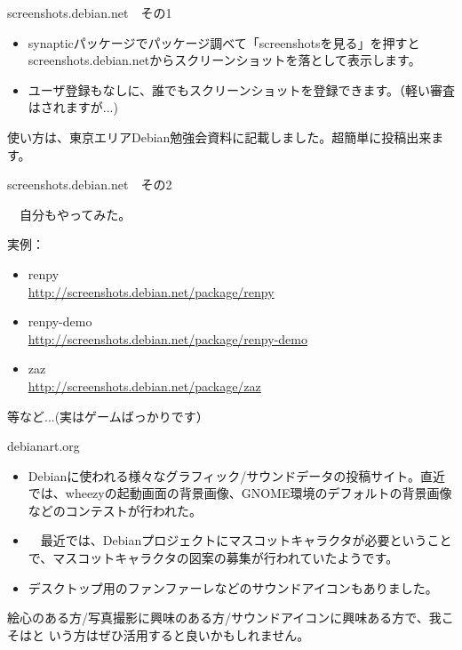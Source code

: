 \begin{frame}{screenshots.debian.net　その1}

\begin{itemize}
\item synapticパッケージでパッケージ調べて「screenshotsを見る」を押すと
screenshots.debian.netからスクリーンショットを落として表示します。
\item ユーザ登録もなしに、誰でもスクリーンショットを登録できます。（軽い審査はされますが...)
\end{itemize}

 使い方は、東京エリアDebian勉強会資料に記載しました。超簡単に投稿出来ます。

\end{frame}

\begin{frame}{screenshots.debian.net　その2}

　自分もやってみた。

実例：
\begin{itemize}
\item renpy \\
\url{http://screenshots.debian.net/package/renpy}
\item renpy-demo \\
\url{http://screenshots.debian.net/package/renpy-demo}
\item zaz \\
\url{http://screenshots.debian.net/package/zaz}
\end{itemize}
等など...(実はゲームばっかりです）

\end{frame}

\begin{frame}{debianart.org}

\begin{itemize} 
\item   Debianに使われる様々なグラフィック/サウンドデータの投稿サイト。直近では、wheezyの起動画面の背景画像、GNOME環境のデフォルトの背景画像などのコンテストが行われた。
\item 　最近では、Debianプロジェクトにマスコットキャラクタが必要ということで、マスコットキャラクタの図案の募集が行われていたようです。
\item デスクトップ用のファンファーレなどのサウンドアイコンもありました。
\end{itemize}

 絵心のある方/写真撮影に興味のある方/サウンドアイコンに興味ある方で、我こそはと
いう方はぜひ活用すると良いかもしれません。

\end{frame}

